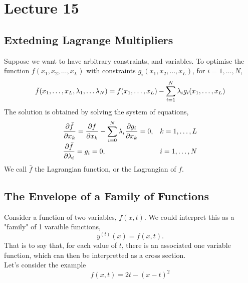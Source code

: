 \documentclass{report}
\begin{document}
\section{Lecture 15}
\subsection*{Extedning Lagrange Multipliers}
Suppose we want to have arbitrary constraints, and variables. To optimise the function $f(x_1, x_2,\dots,x_L)$ with constraints $g_i(x_1,x_2,\dots,x_L)$, for $i=1,\dots,N$,
$$
	\bar{f}(x_1,\dots,x_L,\lambda_1,\dots\lambda_N) = f(x_1,\dots,x_L) - \sum_{i=1}^{N} \lambda_i g_i(x_1,\dots,x_L)
$$
The solution is obtained by solving the system of equations,
$$
	\begin{array}{ll}
		\displaystyle{\frac{\partial \bar{f}}{\partial x_k} = \frac{\partial f}{\partial x_k} - \sum_{i=0}^{N}\lambda_i\frac{\partial g_i}{\partial x_k} = 0,} & k = 1,\dots,L \\
		\displaystyle{\frac{\partial \bar{f}}{\partial \lambda_i} = g_i = 0,} & i=1,\dots,N
	\end{array}
$$
We call $\bar{f}$ the Lagrangian function, or the Lagrangian of $f$.


\subsection*{The Envelope of a Family of Functions}
Consider a function of two variables, $f(x,t)$. We could interpret this as a "family" of 1 varaible functions,
$$
	y^{(t)}(x)=f(x,t).
$$
That is to say that, for each value of $t$, there is an associated one variable function, which can then be interpretted as a cross section. \\

Let's consider the example
$$
	f(x,t) = 2t - (x-t)^2
$$

\begin{center}
\end{center}
\end{document}
